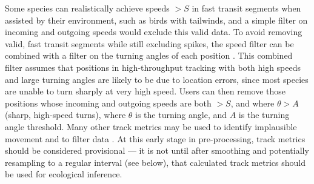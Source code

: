 Some species can realistically achieve speeds $> S$ in fast transit segments when assisted by their environment, such as birds with tailwinds, and a simple filter on incoming and outgoing speeds would exclude this valid data.
To avoid removing valid, fast transit segments while still excluding spikes, the speed filter can be combined with a filter on the turning angles of each position \citep[see][]{bjorneraas2010, calenge2009}.
This combined filter assumes that positions in high-throughput tracking with both high speeds and large turning angles are likely to be due to location errors, since most species are unable to turn sharply at very high speed.
Users can then remove those positions whose incoming and outgoing speeds are both $> S$, and where $\theta > A$ (sharp, high-speed turns), where $\theta$ is the turning angle, and $A$ is the turning angle threshold.
Many other track metrics may be used to identify implausible movement and to filter data \citep{seidel2018}.
At this early stage in pre-processing, track metrics should be considered provisional --- it is not until after smoothing and potentially resampling to a regular interval (see below), that calculated track metrics should be used for ecological inference.





